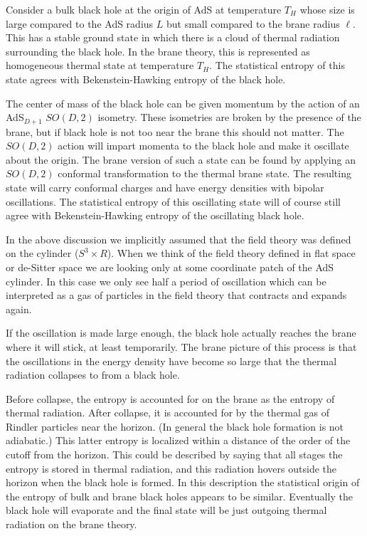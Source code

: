 Consider a bulk black hole at the origin of AdS at temperature 
$T_H$ whose size is large
compared to the AdS radius $L$ but small compared to the brane radius 
$\ell$. This has a stable ground state in which there is a cloud of 
thermal radiation surrounding the black hole. In the brane theory, 
this is represented as homogeneous thermal state at temperature $T_H$. 
The statistical entropy of this state agrees with Bekenstein-Hawking 
entropy of the black hole.

The center of mass of the black hole can be given momentum by 
the action of an AdS$_{D+1}$ $SO(D,2)$ isometry. These isometries are broken
by the 
presence of the brane, but if black hole is not too near the brane 
this should not matter. The $SO(D,2)$  action will 
impart momenta to the black hole and make it
oscillate about the origin. The brane version of such a state 
can be found by applying an $SO(D,2)$ conformal transformation to the thermal 
brane state. The resulting state will carry conformal charges and 
have energy densities with bipolar oscillations. 
The statistical entropy of this 
oscillating state will of course still agree with Bekenstein-Hawking 
entropy of the oscillating black hole.   

In the above discussion we implicitly assumed that the field theory was defined 
on the cylinder ($S^3 \times R$).
 When we think of the field theory defined in 
flat space or de-Sitter space we are looking only at some coordinate 
patch of the AdS cylinder.  
In this case we only see half a period of oscillation which can be
interpreted
as a gas of particles in the field theory that contracts and expands
again. 

If the oscillation is  made large enough, the black hole actually reaches
the brane where it will stick, at least temporarily. The brane picture of
this process is that the oscillations in the energy density have become so
large that the thermal radiation collapses to from a black 
hole.

Before collapse, the entropy is accounted for on the brane as 
the entropy of thermal radiation. After collapse, it is 
accounted for by the thermal gas of Rindler particles near the 
horizon.  (In general the black hole formation 
is not adiabatic.) 
This latter entropy is localized within a distance of the order of the 
cutoff from the horizon.  This could be described by saying that 
all stages the entropy is stored in thermal radiation, and this 
radiation hovers 
outside the horizon when the black hole is formed. In this description the 
statistical origin of the entropy of bulk and brane black holes 
appears to be similar. 
Eventually the black hole will evaporate and the final state will be just
outgoing thermal radiation on the brane theory. 


